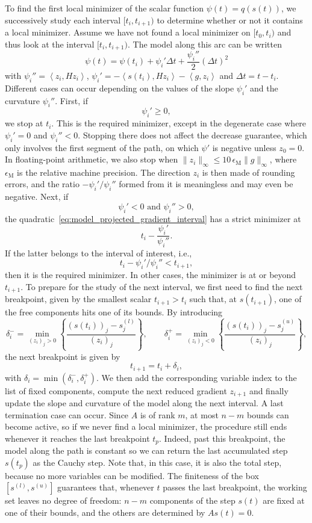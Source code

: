 \documentclass{article}
\numberwithin{equation}{section}
\newcommand{\inner}[2]{\left\langle {#1} , {#2} \right\rangle} %
\theoremstyle{plain}
\begin{document}
To find the first local minimizer of the scalar function $\psi(t) = q(s(t))$, we successively study each interval $[t_i, t_{i+1})$ to determine whether or not it contains a local minimizer.
Assume we have not found a local minimizer on $[t_0, t_i)$ and thus look at the interval $[t_i, t_{i+1})$. The model along this arc can be written
\begin{equation}\label{eq:model_projected_gradient_interval}
	\psi(t) = \psi(t_i) + \psi_i'\Delta t + \dfrac{\psi_i''}{2}(\Delta t)^2
\end{equation}
with
$\psi_i'' = \inner{z_i}{Hz_i}$, $\psi_i' = -\inner{s(t_i)}{Hz_i} - \inner{g}{z_i}$ and $\Delta t = t-t_i$.
Different cases can occur depending on the values of the slope $\psi_i'$ and the curvature $\psi_i''$. 
First, if
\[\psi_i' \ge 0,\]
we stop at $t_i$. This is the required minimizer, except in the degenerate case where $\psi_i' = 0$ and $\psi_i'' < 0$. Stopping there does not affect the decrease guarantee, which only involves the first segment of the path, on which $\psi'$ is negative unless $z_0 = 0$. In floating-point arithmetic, we also stop when $\|z_i\|_\infty \le 10\,\epsilon_{\mathrm{M}}\|g\|_\infty$, where $\epsilon_{\mathrm{M}}$ is the relative machine precision. The direction $z_i$ is then made of rounding errors, and the ratio $-\psi_i'/\psi_i''$ formed from it is meaningless and may even be negative. Next, if
\[\psi_i' < 0 \text{ and } \psi_i'' > 0,\]
the quadratic~\eqref{eq:model_projected_gradient_interval} has a strict minimizer at
\[t_i- \dfrac{\psi_i'}{\psi_i''}.\]
If the latter belongs to the interval of interest, i.e.,
\[t_i-\psi_i'/\psi_i'' < t_{i+1},\]
then it is the required minimizer. In other cases, the minimizer is at or beyond $t_{i+1}$. To prepare for the study of the next interval, we first need to find the next breakpoint, given by the smallest scalar $t_{i+1}>t_i$ such that, at $s(t_{i+1})$, one of the free components hits one of its bounds. By introducing
\[\delta_i^- = \min_{(z_i)_j > 0} \left\{ \dfrac{(s(t_i))_j - s^{(l)}_j}{(z_i)_j}\right\}, \qquad \delta_i^+ = \min_{(z_i)_j < 0} \left\{ \dfrac{(s(t_i))_j - s^{(u)}_j}{(z_i)_j}\right\},\]
the next breakpoint is given by 
\begin{equation}\label{eq:next_breakpoint}
	t_{i+1} = t_i + \delta_i,
\end{equation} 
with $\delta_i = \min\left(\delta_i^-, \delta_i^+\right)$. We then add the corresponding variable index to the list of fixed components, compute the next reduced gradient $z_{i+1}$ and finally update the slope and curvature of the model along the next interval. A last termination case can occur. Since $A$ is of rank $m$, at most $n-m$ bounds can become active, so if we never find a local minimizer, the procedure still ends whenever it reaches the last breakpoint $t_{p}$. Indeed, past this breakpoint, the model along the path is constant so we can return the last accumulated step $s(t_p)$ as the Cauchy step. Note that, in this case, it is also the total step, because no more variables can be modified. The finiteness of the box $\left[s^{(l)}, s^{(u)}\right]$ guarantees that, whenever $t$ passes the last breakpoint, the working set leaves no degree of freedom: $n-m$ components of the step $s(t)$ are fixed at one of their bounds, and the others are determined by $As(t) = 0$.
\end{document}
